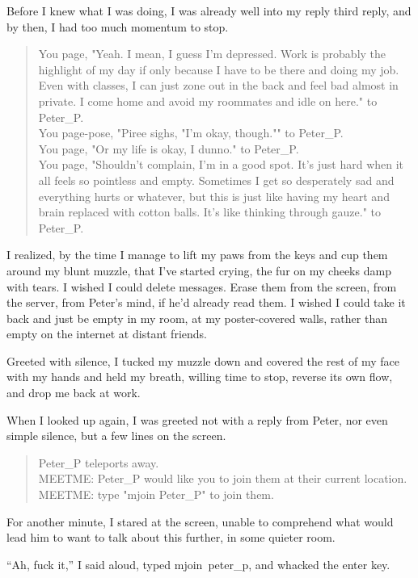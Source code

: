 Before I knew what I was doing, I was already well into my reply third reply, and by then, I had too much momentum to stop.

\begin{verse}
    {\MUCKFamily
You page, "Yeah. I mean, I guess I'm depressed. Work is probably the highlight of my day if only because I have to be there and doing my job. Even with classes, I can just zone out in the back and feel bad almost in private. I come home and avoid my roommates and idle on here." to Peter\_P.\\
You page-pose, "Piree sighs, "I'm okay, though."" to Peter\_P.\\
You page, "Or my life is okay, I dunno." to Peter\_P.\\
You page, "Shouldn't complain, I'm in a good spot. It's just hard when it all feels so pointless and empty. Sometimes I get so desperately sad and everything hurts or whatever, but this is just like having my heart and brain replaced with cotton balls. It's like thinking through gauze." to Peter\_P.}
\end{verse}

I realized, by the time I manage to lift my paws from the keys and cup them around my blunt muzzle, that I've started crying, the fur on my cheeks damp with tears. I wished I could delete messages. Erase them from the screen, from the server, from Peter's mind, if he'd already read them. I wished I could take it back and just be empty in my room, at my poster-covered walls, rather than empty on the internet at distant friends.

Greeted with silence, I tucked my muzzle down and covered the rest of my face with my hands and held my breath, willing time to stop, reverse its own flow, and drop me back at work.

When I looked up again, I was greeted not with a reply from Peter, nor even simple silence, but a few lines on the screen.

\begin{verse}
    {\MUCKFamily
Peter\_P teleports away.\\
MEETME: Peter\_P would like you to join them at their current location.\\
MEETME: type "mjoin Peter\_P" to join them.}
\end{verse}

For another minute, I stared at the screen, unable to comprehend what would lead him to want to talk about this further, in some quieter room.

``Ah, fuck it,'' I said aloud, typed {\MUCKFamily mjoin\ peter\_p}, and whacked the enter key.

